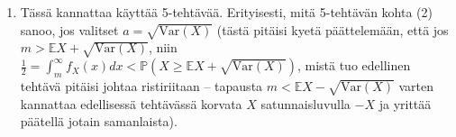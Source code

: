 \documentclass[11pt,a4paper]{amsart}
\newcommand{\E}{\mathbb{E}}
\newcommand{\1}{\mathbf{1}}
\renewcommand{\P}{\mathbb P}
\begin{document}
\begin{Solution}
\begin{enumerate}
\item Tässä kannattaa käyttää 5-tehtävää. Erityisesti, mitä 5-tehtävän kohta (2) sanoo, jos valitset $a=\sqrt{\mathrm{Var}(X)}$ (tästä pitäisi kyetä päättelemään, että jos $m>\E X+\sqrt{\mathrm{Var}(X)}$, niin $\frac{1}{2}=\int_m^\infty f_X(x)dx<\P(X\geq \E X+\sqrt{\mathrm{Var}(X)})$, mistä tuo edellinen tehtävä pitäisi johtaa ristiriitaan -- tapausta $m<\E X-\sqrt{\mathrm{Var}(X)}$ varten kannattaa edellisessä tehtävässä korvata $X$ satunnaisluvulla $-X$ ja yrittää päätellä jotain samanlaista). 
\end{enumerate}
\end{Solution}
\end{document}
